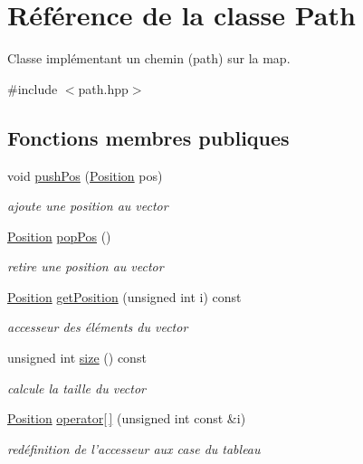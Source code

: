 \hypertarget{classPath}{\section{Référence de la classe Path}
\label{classPath}
}


Classe implémentant un chemin (path) sur la map.  




{\ttfamily \#include $<$path.\+hpp$>$}

\subsection*{Fonctions membres publiques}
\begin{DoxyCompactItemize}
\item 
\hypertarget{classPath_af2fb51479b719021bbdb3a1d540d1c78}{void \hyperlink{classPath_af2fb51479b719021bbdb3a1d540d1c78}{push\+Pos} (\hyperlink{classPosition}{Position} pos)}\label{classPath_af2fb51479b719021bbdb3a1d540d1c78}

\begin{DoxyCompactList}\small\item\em ajoute une position au vector \end{DoxyCompactList}\item 
\hyperlink{classPosition}{Position} \hyperlink{classPath_a3ba977222e0dbfbf731bdf1d4856f5de}{pop\+Pos} ()
\begin{DoxyCompactList}\small\item\em retire une position au vector \end{DoxyCompactList}\item 
\hyperlink{classPosition}{Position} \hyperlink{classPath_a1d790239748af16e157aaa04ce262a36}{get\+Position} (unsigned int i) const 
\begin{DoxyCompactList}\small\item\em accesseur des éléments du vector \end{DoxyCompactList}\item 
unsigned int \hyperlink{classPath_a5a0eb3303c0e3fed707c9e0cf6f31257}{size} () const 
\begin{DoxyCompactList}\small\item\em calcule la taille du vector \end{DoxyCompactList}\item 
\hypertarget{classPath_a3b2b7259396354a7a79245065a363373}{\hyperlink{classPosition}{Position} \hyperlink{classPath_a3b2b7259396354a7a79245065a363373}{operator\mbox{[}$\,$\mbox{]}} (unsigned int const \&i)}\label{classPath_a3b2b7259396354a7a79245065a363373}

\begin{DoxyCompactList}\small\item\em redéfinition de l'accesseur aux case du tableau \end{DoxyCompactList}\end{DoxyCompactItemize}


